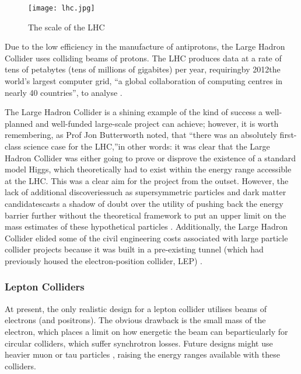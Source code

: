 \begin{figure}[!htb]
\centering
\texttt{[image: lhc.jpg]}
\caption{The scale of the LHC \cite{ATLAS:Gallery:Online}}
\end{figure}

Due to the low efficiency in the manufacture of antiprotons, the Large Hadron Collider uses colliding beams of protons. The LHC produces data at a rate of tens of petabytes (tens of millions of gigabites) per year, requiring\textemdash by 2012\textemdash the world's largest computer grid, ``a global collaboration of computing centres in nearly 40 countries'', to analyse \cite{LHC:ComputingGrid:Online}.

The Large Hadron Collider is a shining example of the kind of success a well-planned and well-funded large-scale project can achieve; however, it is worth remembering, as Prof Jon Butterworth noted, that ``there was an absolutely first-class science case for the LHC,''\textemdash in other words: it was clear that the Large Hadron Collider was either going to prove or disprove the existence of a standard model Higgs, which theoretically had to exist within the energy range accessible at the LHC. This was a clear aim for the project from the outset. However, the lack of additional discoveries\textemdash such as supersymmetric particles and dark matter candidates\textemdash casts a shadow of doubt over the utility of pushing back the energy barrier further without the theoretical framework to put an upper limit on the mass estimates of these hypothetical particles \cite{Butterworth:Interview}. Additionally, the Large Hadron Collider elided some of the civil engineering costs associated with large particle collider projects because it was built in a pre-existing tunnel (which had previously housed the electron-position collider, LEP) \cite{CERN:LEP:Online}.

\subsubsection{Lepton Colliders}
At present, the only realistic design for a lepton collider utilises beams of electrons (and positrons). The obvious drawback is the small mass of the electron, which places a limit on how energetic the beam can be\textemdash particularly for circular colliders, which suffer synchrotron losses. Future designs might use heavier muon or tau particles \cite{Fermi:Muon:Online}, raising the energy ranges available with these colliders.

